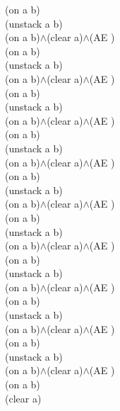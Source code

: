 {{(on a b)\\
(unstack a b)\\
(on a b)$\wedge$(clear a)$\wedge$(AE )\\
(on a b)\\
(unstack a b)\\
(on a b)$\wedge$(clear a)$\wedge$(AE )\\
(on a b)\\
(unstack a b)\\
(on a b)$\wedge$(clear a)$\wedge$(AE )\\
(on a b)\\
(unstack a b)\\
(on a b)$\wedge$(clear a)$\wedge$(AE )\\
(on a b)\\
(unstack a b)\\
(on a b)$\wedge$(clear a)$\wedge$(AE )\\
(on a b)\\
(unstack a b)\\
(on a b)$\wedge$(clear a)$\wedge$(AE )\\
(on a b)\\
(unstack a b)\\
(on a b)$\wedge$(clear a)$\wedge$(AE )\\
(on a b)\\
(unstack a b)\\
(on a b)$\wedge$(clear a)$\wedge$(AE )\\
(on a b)\\
(unstack a b)\\
(on a b)$\wedge$(clear a)$\wedge$(AE )\\
(on a b)\\
(clear a)\\
}%
}

